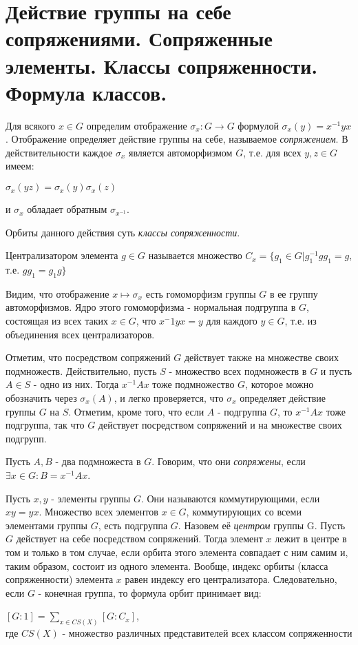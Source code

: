 \section{Действие группы на себе сопряжениями. Сопряженные элементы. Классы сопряженности. Формула классов.}

Для всякого $x \in G$ определим отображение $\sigma_x: G \rightarrow G$ формулой $\sigma_x(y) = x^{-1}yx$. Отображение
определяет действие группы на себе, называемое \emph{сопряжением}. В действительности каждое $\sigma_x$ является
автоморфизмом $G$, т.е. для всех $y, z \in G$ имеем:
\begin{center} $\sigma_x(yz) = \sigma_x(y)\sigma_x(z)$\\ \end{center}
и $\sigma_x$ обладает обратным $\sigma_{x^{-1}}$.

Орбиты данного действия суть \emph{классы сопряженности}.

\begin{defn}
Централизатором элемента $g \in G$ называется множество $C_x = \{g_1 \in G | g^{-1}_1gg_1 = g$, т.е. $gg_1 = g_1g\}$
\end{defn}


Видим, что отображение $x \mapsto \sigma_x$ есть гомоморфизм группы $G$ в ее группу автоморфизмов. Ядро этого гомоморфизма
- нормальная подгруппа в $G$, состоящая из всех таких $x \in G$, что $x^-1yx = y$ для каждого $y \in G$, т.е. из
объединения всех централизаторов. 

Отметим, что посредством сопряжений $G$ действует также на множестве своих подмножеств. Действительно, пусть $S$ - множество
всех подмножеств в $G$ и пусть $A \in S$ - одно из них. Тогда $x^{-1}Ax$ тоже подмножество $G$, которое можно обозначить
через $\sigma_x(A)$, и легко проверяется, что $\sigma_x$ определяет действие группы $G$ на $S$. Отметим, кроме того, что
если $A$ - подгруппа $G$, то $x^{-1}Ax$ тоже подгруппа, так что $G$ действует посредством сопряжений и на множестве своих
подгрупп.

\begin{defn}
Пусть $A, B$ - два подмножеста в $G$. Говорим, что они \emph{сопряжены}, если $\exists x \in G: B = x^{-1}Ax$.
\end{defn}

Пусть $x, y$ - элементы группы $G$. Они называются коммутирующими, если $xy = yx$. Множество всех элементов $x \in G$,
коммутирующих со всеми элементами группы $G$, есть подгруппа $G$. Назовем её \emph{центром} группы G. Пусть $G$ действует
на себе посредством сопряжений. Тогда элемент $x$ лежит в центре в том и только в том случае, если орбита этого элемента
совпадает с ним самим и, таким образом, состоит из одного элемента. Вообще, индекс орбиты (класса сопряженности) элемента
$x$ равен индексу его централизатора. Следовательно, если $G$ - конечная группа, то формула орбит принимает вид:
\begin{center} $[G:1] = {\underset{x \in CS(X)}{\sum}}[G : C_x]$,\\
где $CS(X)$ - множество различных представителей всех классом сопряженности \end{center}